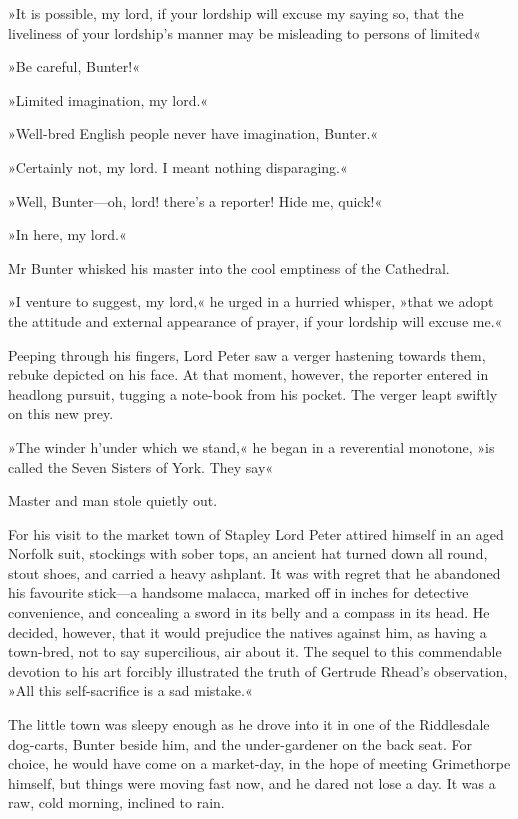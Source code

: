 »It is possible, my lord, if your lordship will excuse my saying so, that the liveliness of your lordship's manner may be misleading to persons of limited\longdash«

»Be careful, Bunter!«

»Limited imagination, my lord.«

»Well-bred English people never have imagination, Bunter.«

»Certainly not, my lord. I meant nothing disparaging.«

»Well, Bunter—oh, lord! there's a reporter! Hide me, quick!«

»In here, my lord.«

Mr Bunter whisked his master into the cool emptiness of the Cathedral.

»I venture to suggest, my lord,« he urged in a hurried whisper, »that we adopt the attitude and external appearance of prayer, if your lordship will excuse me.«

Peeping through his fingers, Lord Peter saw a verger hastening towards them, rebuke depicted on his face. At that moment, however, the reporter entered in headlong pursuit, tugging a note-book from his pocket. The verger leapt swiftly on this new prey.

»The winder h'under which we stand,« he began in a reverential monotone, »is called the Seven Sisters of York. They say\longdash«

Master and man stole quietly out.

For his visit to the market town of Stapley Lord Peter attired himself in an aged Norfolk suit, stockings with sober tops, an ancient hat turned down all round, stout shoes, and carried a heavy ashplant. It was with regret that he abandoned his favourite stick—a handsome malacca, marked off in inches for detective convenience, and concealing a sword in its belly and a compass in its head. He decided, however, that it would prejudice the natives against him, as having a town-bred, not to say supercilious, air about it. The sequel to this commendable devotion to his art forcibly illustrated the truth of Gertrude Rhead's observation, »All this self-sacrifice is a sad mistake.«

The little town was sleepy enough as he drove into it in one of the Riddlesdale dog-carts, Bunter beside him, and the under-gardener on the back seat. For choice, he would have come on a market-day, in the hope of meeting Grimethorpe himself, but things were moving fast now, and he dared not lose a day. It was a raw, cold morning, inclined to rain.

